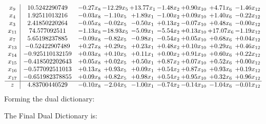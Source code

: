 \documentclass[8pt]{article}
\begin{document}
\[\begin{array}{c| c c@{\hskip 2pt} c@{\hskip 2pt} c@{\hskip 2pt} c@{\hskip 2pt} c@{\hskip 2pt} c@{\hskip 2pt} c@{\hskip 2pt} }
 x_{9}   &  10.5242290749 & -0.27 x_{8} & -12.29 x_{5} & + 13.77 x_{1} & -1.48 x_{2} & +  0.90 x_{10} & +  4.71 x_{6} & -1.46 x_{12}\\
 x_{4}   &  1.92511013216 & -0.03 x_{8} & -1.10 x_{5} & +  1.89 x_{1} & -1.00 x_{2} & +  0.09 x_{10} & +  1.40 x_{6} & -0.22 x_{12}\\
 x_{3}   &  2.41850220264 & -0.05 x_{8} & -0.02 x_{5} & -0.50 x_{1} & +  0.13 x_{2} & -0.07 x_{10} & +  0.48 x_{6} & -0.00 x_{12}\\
 x_{11}   &  74.577092511 & -1.13 x_{8} & -18.93 x_{5} & -5.09 x_{1} & -5.54 x_{2} & +  0.13 x_{10} & + 17.07 x_{6} & -1.19 x_{12}\\
 x_{7}   &  5.65198237885 & -0.09 x_{8} & -0.82 x_{5} & -0.98 x_{1} & -0.54 x_{2} & +  0.05 x_{10} & +  0.68 x_{6} & +  0.04 x_{12}\\
 x_{13}   &  -0.52422907489 & +  0.27 x_{8} & +  0.29 x_{5} & +  0.23 x_{1} & +  0.48 x_{2} & +  0.10 x_{10} & +  0.29 x_{6} & +  0.46 x_{12}\\
 x_{14}   &  -0.925110132159 & +  0.03 x_{8} & +  0.10 x_{5} & +  0.11 x_{1} & +  0.00 x_{2} & +  0.91 x_{10} & +  0.60 x_{6} & +  0.22 x_{12}\\
 x_{15}   &  -0.418502202643 & +  0.05 x_{8} & +  0.02 x_{5} & +  0.50 x_{1} & +  0.87 x_{2} & +  0.07 x_{10} & +  0.52 x_{6} & +  0.00 x_{12}\\
 x_{16}   &  -0.577092511013 & +  0.13 x_{8} & +  0.93 x_{5} & +  0.09 x_{1} & +  0.54 x_{2} & +  0.87 x_{10} & +  0.93 x_{6} & +  0.19 x_{12}\\
 x_{17}   &  -0.651982378855 & +  0.09 x_{8} & +  0.82 x_{5} & +  0.98 x_{1} & +  0.54 x_{2} & +  0.95 x_{10} & +  0.32 x_{6} & +  0.96 x_{12}\\
\hline
z    &  4.83700440529 & -0.10 x_{8} & -2.04 x_{5} & -1.00 x_{1} & -0.74 x_{2} & -0.14 x_{10} & -1.04 x_{6} & -0.01 x_{12}\\
\end{array}\]
Forming the dual dictionary:

The Final Dual Dictionary is: 
\end{document}
